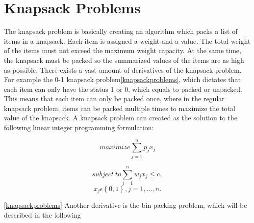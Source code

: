 \section{Knapsack Problems}
\label{sec:knapsack}
The knapsack problem is basically creating an algorithm which packs a list of items in a knapsack. Each item is assigned a weight and a value. The total weight of the items must not exceed the maximum weight capacity. At the same time, the knapsack must be packed so the summarized values of the items are as high as possible. There exists a vast amount of derivatives of the knapsack problem. For example the 0-1 knapsack problem\ref{knapsackproblems}, which dictates that each item can only have the status 1 or 0, which equals to packed or unpacked. This means that each item can only be packed once, where in the regular knapsack problem, items can be packed multiple times to maximize the total value of the knapsack. A knapsack problem can created as the solution to the following linear integer programming formulation:

\[maximize \sum\limits_{j=1}^n p_jx_j\]

\[subject~to \sum\limits_{j=1}^n w_jx_j\leq c,\]
\[x_j \epsilon \left \{ 0,1 \right \}, j=1,...,n.\]


 \ref{knapsackproblems}
\newline
Another derivative is the bin packing problem, which will be described in the following